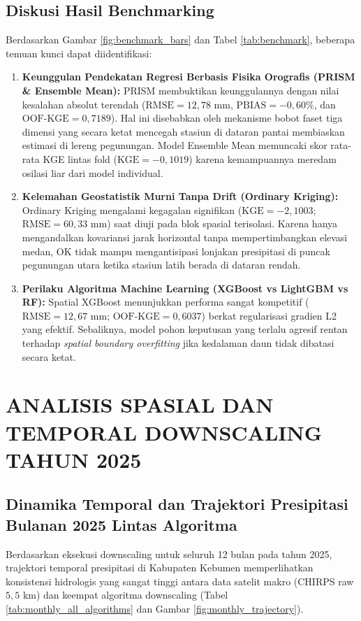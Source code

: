 \documentclass[11pt,a4paper]{article}
\begin{document}
\subsection{Diskusi Hasil Benchmarking}
Berdasarkan Gambar \ref{fig:benchmark_bars} dan Tabel \ref{tab:benchmark}, beberapa temuan kunci dapat diidentifikasi:
\begin{enumerate}
    \item \textbf{Keunggulan Pendekatan Regresi Berbasis Fisika Orografis (PRISM \& Ensemble Mean):}
    PRISM membuktikan keunggulannya dengan nilai kesalahan absolut terendah ($\text{RMSE} = 12,78\text{ mm}$, $\text{PBIAS} = -0,60\%$, dan $\text{OOF-KGE} = 0,7189$). Hal ini disebabkan oleh mekanisme bobot faset tiga dimensi yang secara ketat mencegah stasiun di dataran pantai membiaskan estimasi di lereng pegunungan. Model Ensemble Mean memuncaki skor rata-rata KGE lintas fold ($\text{KGE} = -0,1019$) karena kemampuannya meredam osilasi liar dari model individual.
    \item \textbf{Kelemahan Geostatistik Murni Tanpa Drift (Ordinary Kriging):}
    Ordinary Kriging mengalami kegagalan signifikan ($\text{KGE} = -2,1003$; $\text{RMSE} = 60,33\text{ mm}$) saat diuji pada blok spasial terisolasi. Karena hanya mengandalkan kovariansi jarak horizontal tanpa mempertimbangkan elevasi medan, OK tidak mampu mengantisipasi lonjakan presipitasi di puncak pegunungan utara ketika stasiun latih berada di dataran rendah.
    \item \textbf{Perilaku Algoritma Machine Learning (XGBoost vs LightGBM vs RF):}
    Spatial XGBoost menunjukkan performa sangat kompetitif ($\text{RMSE} = 12,67\text{ mm}$; $\text{OOF-KGE} = 0,6037$) berkat regularisasi gradien L2 yang efektif. Sebaliknya, model pohon keputusan yang terlalu agresif rentan terhadap \textit{spatial boundary overfitting} jika kedalaman daun tidak dibatasi secara ketat.
\end{enumerate}

\section{ANALISIS SPASIAL DAN TEMPORAL DOWNSCALING TAHUN 2025}

\subsection{Dinamika Temporal dan Trajektori Presipitasi Bulanan 2025 Lintas Algoritma}
Berdasarkan eksekusi downscaling untuk seluruh 12 bulan pada tahun 2025, trajektori temporal presipitasi di Kabupaten Kebumen memperlihatkan konsistensi hidrologis yang sangat tinggi antara data satelit makro (CHIRPS raw $5,5\text{ km}$) dan keempat algoritma downscaling (Tabel \ref{tab:monthly_all_algorithms} dan Gambar \ref{fig:monthly_trajectory}).
\end{document}
